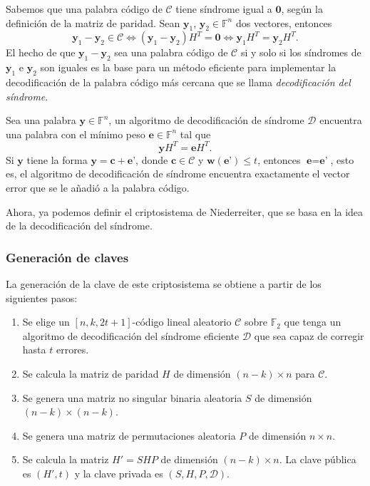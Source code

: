Sabemos que una palabra código de $\mathcal{C}$ tiene síndrome igual a $\textbf{0}$, según la definición de la matriz de paridad. Sean $\textbf{y}_1$, $\textbf{y}_2 \in \mathbb{F}^n$ dos vectores, entonces
\[
    \textbf{y}_1 - \textbf{y}_2 \in \mathcal{C} \Leftrightarrow (\textbf{y}_1 - \textbf{y}_2) H^T = \textbf{0} \Leftrightarrow \textbf{y}_1 H^T = \textbf{y}_2 H^T.
\]
El hecho de que $\textbf{y}_1 - \textbf{y}_2$ sea una palabra código de $\mathcal{C}$ si y solo si los síndromes de $\textbf{y}_1$ e $\textbf{y}_2$ son iguales es la base para un método eficiente para implementar la decodificación de la palabra código más cercana que se llama \emph{decodificación del síndrome}.

Sea una palabra $\textbf{y} \in \mathbb{F}^n$, un algoritmo de decodificación de síndrome $\mathcal{D}$ encuentra una palabra con el mínimo peso $\textbf{e} \in \mathbb{F}^n$ tal que
\[
    \textbf{y} H^T = \textbf{e} H^T.
\]
Si $\textbf{y}$ tiene la forma $\textbf{y} = \textbf{c} + \textbf{e'}$, donde $\textbf{c} \in \mathcal{C}$ y $\textbf{w}(\textbf{e'}) \leq t$, entonces $\textbf{e} = \textbf{e'}$, esto es, el algoritmo de decodificación de síndrome encuentra exactamente el vector error que se le añadió a la palabra código.

Ahora, ya podemos definir el criptosistema de Niederreiter, que se basa en la idea de la decodificación del síndrome.

\subsubsection{Generación de claves}

La generación de la clave de este criptosistema se obtiene a partir de los siguientes pasos:

\begin{enumerate}
    \item Se elige un $[n, k, 2t + 1]$-código lineal aleatorio $\mathcal{C}$ sobre $\mathbb{F}_2$ que tenga un algoritmo de decodificación del síndrome eficiente $\mathcal{D}$ que sea capaz de corregir hasta $t$ errores.
    \item Se calcula la matriz de paridad $H$ de dimensión $(n - k) \times n$ para $\mathcal{C}$.
    \item Se genera una matriz no singular binaria aleatoria $S$ de dimensión $(n - k) \times (n - k)$.
    \item Se genera una matriz de permutaciones aleatoria $P$ de dimensión $n \times n$.
    \item Se calcula la matriz $H' = SHP$ de dimensión $(n - k) \times n$. La clave pública es $(H', t)$ y la clave privada es $(S, H, P, \mathcal{D})$.
\end{enumerate}

